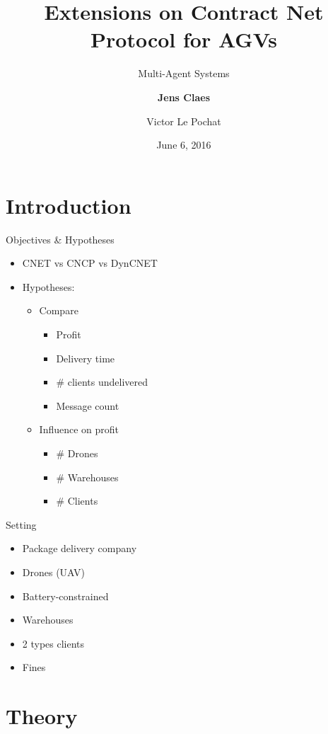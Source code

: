 \documentclass{beamer}
\title{Extensions on Contract Net Protocol for AGVs}
\subtitle{Multi-Agent Systems}
\author{\textbf{Jens Claes} \and Victor Le Pochat}
\date{June 6, 2016}
\begin{document}
	\frame{\titlepage}

	\section{Introduction}
	
	\begin{frame}{Objectives \& Hypotheses}
		\begin{itemize}
		\item CNET vs CNCP vs DynCNET
		\item Hypotheses:
			\begin{itemize}
			\item Compare
				\begin{itemize}
				\item Profit
				\item Delivery time
				\item \# clients undelivered
				\item Message count
				\end{itemize}
			\item Influence on profit
				\begin{itemize}
				\item \# Drones
				\item \# Warehouses
				\item \# Clients
				\end{itemize}
			\end{itemize}
		\end{itemize}
	\end{frame}
		
	\begin{frame}{Setting}
		\begin{itemize}
		\item Package delivery company
		\item Drones (UAV)
		\item Battery-constrained
		\item Warehouses
		\item 2 types clients
		\item Fines
		\end{itemize}
	\end{frame}

	\section{Theory}
	
\end{document}
